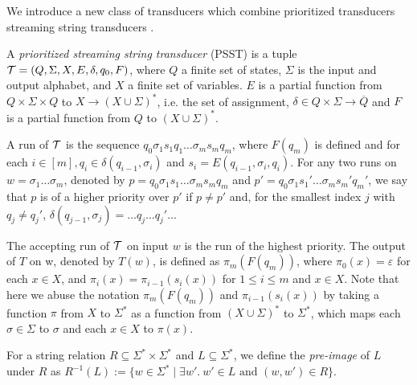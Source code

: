 We introduce  a new class of transducers which combine prioritized transducers \cite{BM17} %
streaming string transducers \cite{AC10,AD11}.
  
\begin{definition}
A \emph{prioritized streaming string transducer} (PSST) is a tuple $\mathcal{T} = (Q, \Sigma, X, E, \delta, q_0, F)$, where $Q$ a
finite set of states, $\Sigma$ is the input and output alphabet, and $X$ a finite set of variables. $E$ is a partial function from $Q \times \Sigma \times
  Q$ to $X \rightarrow (X \cup \Sigma)^{\ast}$, i.e. the set of assignment,
  $\delta \in Q \times \Sigma \rightarrow \overline{Q}$ and $F$ is a partial function
  from $Q$ to $(X \cup \Sigma)^{\ast}$.
\end{definition}

A run of $\mathcal{T}$ is the sequence $q_0 \sigma_1 s_1 q_1 \ldots \sigma_m s_m q_m$, where $F (q_m)$ is defined and for each $i \in [m], q_i \in \delta (q_{i-1}, \sigma_i)$ and $s_i = E (q_{i - 1}, \sigma_i, q_i)$. For any two runs on $w = \sigma_1 \ldots \sigma_m$, denoted by $p = q_0 \sigma_1 s_1 \ldots \sigma_m s_m q_m$ and $p' = q_0 \sigma_1
  s_1' \ldots \sigma_m s_m' q_m'$, we say that $p$ is of a higher priority over
  $p'$ if $p \neq p'$ and, for the smallest index $j$ with $q_j \neq q_j'$,
  $\delta (q_{j - 1}, \sigma_j) = \ldots q_j \ldots q_j' \ldots$
  
  The accepting run of $\mathcal{T}$ on input $w$ is the run of the highest priority. The output of $T$ on w, denoted by $T(w)$, is defined as $\pi_m(F(q_m))$, where $\pi_0(x) = \varepsilon$ for each $x \in X$, and $\pi_{i}(x) = \pi_{i-1}(s_{i}(x))$ for $1 \le i \le m$ and $x \in X$. Note that here we abuse the notation  $\pi_m(F(q_m))$ and $\pi_{i-1}(s_{i}(x))$ by taking a function $\pi$ from $X$ to $\Sigma^*$ as a function from $(X \cup \Sigma)^*$ to $\Sigma^*$, which maps each $\sigma \in \Sigma$ to $\sigma$ and each $x \in X$ to $\pi(x)$.  
  
  
\begin{definition}
For a string relation $R \subseteq \Sigma^* \times \Sigma^*$ and $L \subseteq \Sigma^*$, we define the \emph{pre-image} of $L$ under $R$ as $R^{-1}(L):=\{w \in \Sigma^* \mid \exists w'.\ w' \in L \mbox{ and } (w, w') \in R\}$. 
\end{definition}
 
